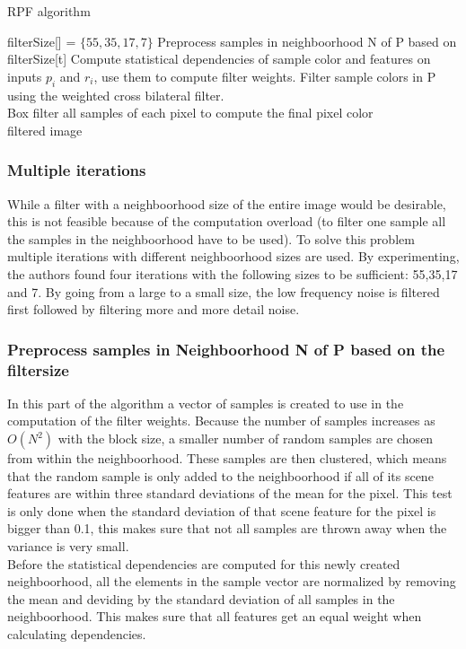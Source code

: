 \begin{algorithm}
  \caption{RPF algorithm}
  \label{algo:RPF}
  \begin{algorithmic}
    \State filterSize[] = $\{55,35,17,7\}$
	 \State Preprocess samples in neighboorhood N of P based on 
	 \State filterSize[t]
	 \State Compute statistical dependencies of sample color and 
	 \State features on inputs $p_i$ and $r_i$, use them to compute filter 
	 \State weights.
	 \State Filter sample colors in P using the weighted cross 
	 \State bilateral filter.
      \EndFor
    \EndFor \\
    Box filter all samples of each pixel to compute the final pixel color \\
    \Return filtered image
  \end{algorithmic}
\end{algorithm}

\subsubsection{Multiple iterations}
While a filter with a neighboorhood size of the entire image would be desirable, this is not feasible because of the computation overload 
(to filter one sample all the samples in the neighboorhood have to be used).
To solve this problem multiple iterations with different neighboorhood sizes are used.
By experimenting, the authors found four iterations with the following sizes to be sufficient: 55,35,17 and 7.
By going from a large to a small size, the low frequency noise is filtered first followed by filtering more and more detail noise.

\subsubsection{Preprocess samples in Neighboorhood N of P based on the filtersize}
In this part of the algorithm a vector of samples is created to use in the computation of the filter weights.
Because the number of samples increases as $O(N^2)$ with the block size, a smaller number of random samples are chosen from within the neighboorhood.
These samples are then clustered, which means that the random sample is only added to the neighboorhood if all of its scene features are within three standard deviations of the mean for the pixel.
This test is only done when the standard deviation of that scene feature for the pixel is bigger than 0.1, this makes sure that not all samples are thrown away when the variance is very small.
\\
Before the statistical dependencies are computed for this newly created neighboorhood, all the elements in the sample vector are normalized by removing the mean and deviding by the standard deviation of all samples in the neighboorhood.
This makes sure that all features get an equal weight when calculating dependencies.

